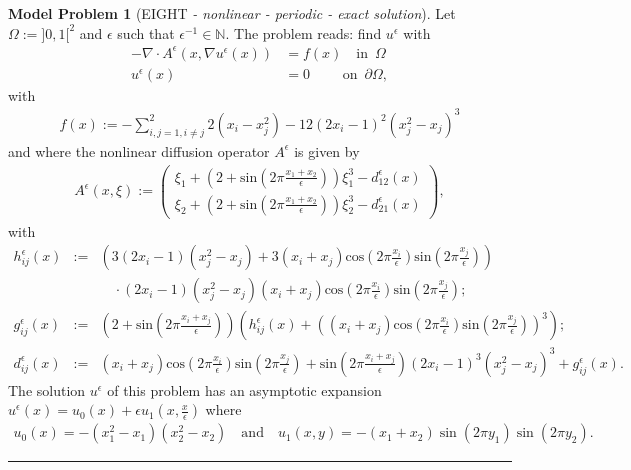 \documentclass[a4paper,11pt]{article}
\theoremstyle{definition}
\newtheorem{modelproblem}{Model Problem} %
\begin{document}
\begin{modelproblem}[EIGHT {\it- nonlinear - periodic - exact solution}]
Let $\Omega := ]0,1[^2$ and $\epsilon$ such that $\epsilon^{-1} \in \mathbb{N}$.  The problem reads: find $u^{\epsilon}$ with
\begin{align*}
- \nabla \cdot A^{\epsilon}(x,\nabla u^{\epsilon}(x)) &= f(x) \quad \mbox{in} \enspace \Omega \\
u^{\epsilon}(x) &= 0 \hspace{28pt} \mbox{on} \enspace \partial \Omega,
\end{align*}
with
\begin{eqnarray*}
 f(x) := - \sum_{i,j=1,i\neq j}^2  2(x_i - x_j^2 ) - 12 (2 x_i - 1)^2(x_j^2 - x_j)^3
\end{eqnarray*}
and where the nonlinear diffusion operator  $A^{\epsilon}$ is given by
\begin{eqnarray*}
A^{\epsilon}(x,\xi) := \left( \begin{array}{c}
                                 \xi_1 + (2 + \mbox{sin}(2 \pi \frac{x_1 + x_2}{\epsilon} )) \xi_1^3 - d^{\epsilon}_{12}(x) \\
                                 \xi_2 + (2 + \mbox{sin}(2 \pi \frac{x_1 + x_2}{\epsilon} )) \xi_2^3 - d^{\epsilon}_{21}(x)
                               \end{array}\right),
\end{eqnarray*}
with
\begin{eqnarray*}
h_{ij}^{\epsilon}(x) &:=& \left( 3 ( 2 x_i - 1) (x_j^2 - x_j )
                   + 3 ( x_i + x_j ) \mbox{cos}( 2 \pi \frac{x_i}{\epsilon} ) \mbox{sin}( 2 \pi \frac{x_j}{\epsilon} ) \right)\\
&\enspace& \quad \cdot
 ( 2 x_i - 1) (x_j^2 - x_j ) ( x_i + x_j ) \mbox{cos}( 2 \pi \frac{x_i}{\epsilon} ) \mbox{sin}( 2 \pi \frac{x_j}{\epsilon} ); \\
g_{ij}^{\epsilon}(x) &:=& (2 + \mbox{sin}( 2 \pi \frac{x_i + x_j}{\epsilon} ) ) \left( h_{ij}^{\epsilon}(x) + \left( ( x_i + x_j ) \mbox{cos}( 2 \pi \frac{x_i}{\epsilon} ) \mbox{sin}( 2 \pi \frac{x_j}{\epsilon} ) \right)^3 \right); \\
 d^{\epsilon}_{ij}(x) &:=& ( x_i + x_j ) \mbox{cos}( 2 \pi \frac{x_i}{\epsilon} ) \mbox{sin}( 2 \pi \frac{x_j}{\epsilon} ) + \mbox{sin}( 2 \pi \frac{x_i + x_j}{\epsilon} ) (2 x_i - 1 )^3 ( x_j^2 - x_j )^3 + g_{ij}^{\epsilon}(x).
\end{eqnarray*}
The solution $u^{\epsilon}$ of this problem has an asymptotic expansion $u^{\epsilon}(x) = u_0(x) + \epsilon u_1(x,\frac{x}{\epsilon})$ where
\begin{eqnarray*}
 u_0(x) = - (x_1^2 - x_1)(x_2^2 - x_2) \quad \mbox{and} \quad u_1(x,y) = - (x_1 + x_2) \sin(2 \pi y_1) \sin(2 \pi y_2).
\end{eqnarray*}

\end{modelproblem}
\hrule
\end{document}
